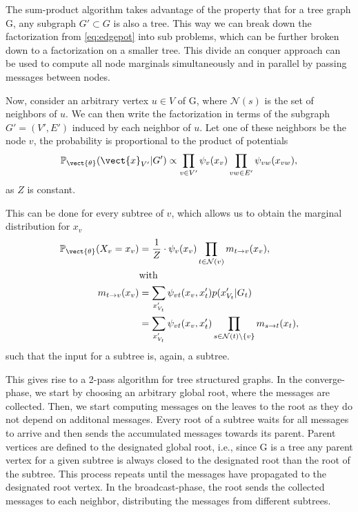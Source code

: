 The sum-product algorithm takes advantage of the property that for a tree graph G, any subgraph $G' \subset G$ is also a tree. 
This way we can break down the factorization from \eq\ref{eq:edgepot} into sub problems, which can be further broken down to a factorization on a smaller tree.
This divide an conquer approach can be used to compute all node marginals simultaneously and in parallel by passing messages between nodes.

Now, consider an arbitrary vertex $u \in V$ of G, where $\mathcal{N}(s)$ is the set of neighbors of $u$.
We can then write the factorization in terms of the subgraph $G'=(V', E')$ induced by each neighbor of $u$. 
Let one of these neighbors be the node $v$, the probability is proportional to the product of potentials
\begin{equation}
    \mathbb{P}_{\vect{\theta}}(\vect{x}_{V'}\lvert G') \propto \prod_{v \in V'} \psi_v(x_v) \prod_{vw \in E'} \psi_{vw}(x_{vw}),
\end{equation}
as $Z$ is constant.

This can be done for every subtree of $v$, which allows us to obtain the marginal distribution for $x_v$
\begin{equation}
    \label{eq:normbp}
    \begin{split}
    \mathbb{P}_{\vect{\theta}}(X_v = x_v) &= \frac{1}{Z} \cdot \psi_v(x_v) \prod_{t \in \mathcal{N}(v)} m_{t \rightarrow v}(x_v),  \\
    & \text{with}\\
    m_{t \rightarrow v}(x_v) &= \sum_{x'_{V_t}} \psi_{vt}(x_v, x_t') p(x'_{V_t} \lvert G_t) \\
    & = \sum_{x'_{V_t}} \psi_{vt}(x_v, x_t')  \prod_{s\in \mathcal{N}(t) \setminus \{v\}} m_{s \rightarrow t}(x_t),
    \end{split}
\end{equation}
such that the input for a subtree is, again, a subtree.

This gives rise to a 2-pass algorithm for tree structured graphs.
In the converge-phase, we start by choosing an arbitrary global root, where the messages are collected.
Then, we start computing messages on the leaves \wrt to the root as they do not depend on additonal messages.
Every root of a subtree waits for all messages to arrive and then sends the accumulated messages towards its parent. 
Parent vertices are defined \wrt to the designated  global root, i.e., since G is a tree any parent vertex for a given subtree is always closed to the designated root than the root of the subtree.
This process repeats until the messages have propagated to the designated root vertex.
In the broadcast-phase, the root sends the collected messages to each neighbor, distributing the messages from different subtrees.

